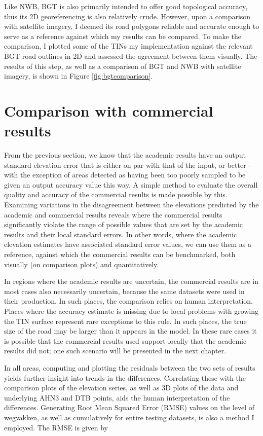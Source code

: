 Like NWB, BGT is also primarily intended to offer good topological accuracy, thus its 2D georeferencing is also relatively crude. However, upon a comparison with satellite imagery, I deemed its road polygons reliable and accurate enough to serve as a reference against which my results can be compared. To make the comparison, I plotted some of the TINs my implementation against the relevant BGT road outlines in 2D and assessed the agreement between them visually. The results of this step, as well as a comparison of BGT and NWB with satellite imagery, is shown in Figure \ref{fig:bgtcomparison}.

\section{Comparison with commercial results}
\label{sec:m_comparison}

From the previous section, we know that the academic results have an output standard elevation error that is either on par with that of the input, or better - with the exception of areas detected as having been too poorly sampled to be given an output accuracy value this way. A simple method to evaluate the overall quality and accuracy of the commercial results is made possible by this. Examining variations in the disagreement between the elevations predicted by the academic and commercial results reveals where the commercial results significantly violate the range of possible values that are set by the academic results and their local standard errors. In other words, where the academic elevation estimates have associated standard error values, we can use them as a reference, against which the commercial results can be benchmarked, both visually (on comparison plots) and quantitatively.

In regions where the academic results are uncertain, the commercial results are in most cases also necessarily uncertain, because the same datasets were used in their production. In such places, the comparison relies on human interpretation. Places where the accuracy estimate is missing due to local problems with growing the TIN surface represent rare exceptions to this rule. In such places, the true size of the road may be larger than it appears in the model. In these rare cases it is possible that the commercial results used support locally that the academic results did not; one such scenario will be presented in the next chapter.

In all areas, computing and plotting the residuals between the two sets of results yields further insight into trends in the differences. Correlating these with the comparison plots of the elevation series, as well as 3D plots of the data and underlying AHN3 and DTB points, aids the human interpretation of the differences. Generating Root Mean Squared Error (RMSE) values on the level of wegvakken, as well as cumulatively for entire testing datasets, is also a method I employed. The RMSE is given by

